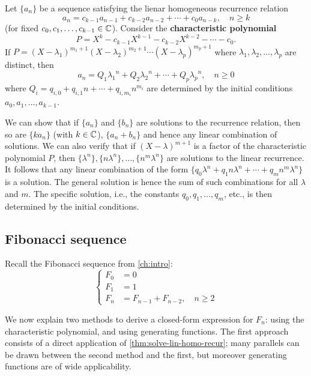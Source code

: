 \documentclass[a4paper, 12pt]{report}
\begin{document}
\begin{thm}\label{thm:solve-lin-homo-recur}
Let $\{a_n\}$ be a sequence satisfying the lienar homogeneous recurrence relation
\[a_n = c_{k - 1} a_{n - 1} + c_{k - 2} a_{n - 2} + \cdots + c_0 a_{n - k}, \quad n \geq k\]
(for fixed $c_0, c_1, \dots, c_{k - 1} \in \mathbb{C}$). Consider the \textbf{characteristic polynomial} 
\[P = X^k - c_{k - 1} X^{k - 1} - c_{k - 2} X^{k - 2} - \cdots - c_0.\]
If $P = (X - \lambda_1)^{m_1 + 1} (X - \lambda_2)^{m_2 + 1} \cdots (X - \lambda_p)^{m_p + 1}$
where $\lambda_1, \lambda_2, \dots, \lambda_p$ are distinct, then 
\[a_n = Q_1 {\lambda_1}^n + Q_2 {\lambda_2}^n + \cdots + Q_p {\lambda_p}^n, \quad n \geq 0\]
where $Q_i = q_{i, 0} + q_{i, 1} n + \cdots + q_{i, m_i} n^{m_i}$ are determined by the initial conditions $a_0, a_1, \dots, a_{k - 1}$.
\end{thm}
\begin{sproof}
We can show that if $\{a_n\}$ and $\{b_n\}$ are solutions to the recurrence relation, then so are $\{k a_n\}$ (with $k \in \mathbb{C}$), $\{a_n + b_n\}$ and hence any linear combination of solutions. We can also verify that if $(X - \lambda)^{m + 1}$ is a factor of the characteristic polynomial $P$, then $\{\lambda^n\}, \{n \lambda^n\}, \dots, \{n^m \lambda^n\}$ are solutions to the linear recurrence. It follows that any linear combination of the form $\{q_0 \lambda^n + q_1 n \lambda^n + \cdots + q_m n^m \lambda^n\}$ is a solution. The general solution is hence the sum of such combinations for all $\lambda$ and $m$. The specific solution, i.e., the constants $q_0, q_1, \dots, q_m$, etc., is then determined by the initial conditions.
\end{sproof}

\subsection{Fibonacci sequence}
Recall the Fibonacci sequence from \cref{ch:intro}:
\[
\begin{cases}
F_0 &= 0\\
F_1 &= 1\\
F_n &= F_{n - 1} + F_{n - 2}, \quad n \geq 2
\end{cases}
\]

We now explain two methods to derive a closed-form expression for $F_n$: using the characteristic polynomial, and using generating functions. The first approach consists of a direct application of \cref{thm:solve-lin-homo-recur}; many parallels can be drawn between the second method and the first, but moreover generating functions are of wide applicability.
\end{document}
